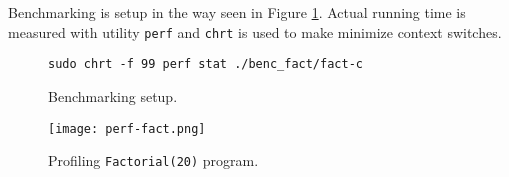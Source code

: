 Benchmarking is setup in the way seen in Figure \ref{bench-setup}. Actual running time is measured with utility \texttt{perf} and \texttt{chrt} is used to make minimize context switches.

\begin{figure}[h]
\begin{verbatim}
sudo chrt -f 99 perf stat ./benc_fact/fact-c 
\end{verbatim}
\caption{Benchmarking setup.}
\label{bench-setup}
\end{figure}


\begin{figure}[h]
\texttt{[image: perf-fact.png]}
\centering
\caption{Profiling \texttt{Factorial(20)} program.}
\label{perf-fact}
\end{figure}
